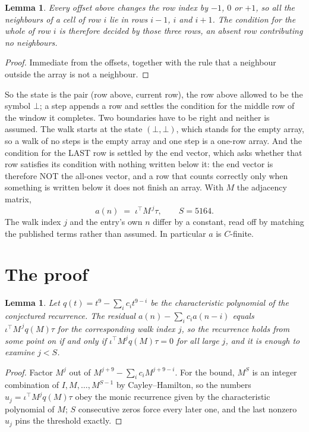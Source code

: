 \documentclass[11pt,a4paper]{article}
\theoremstyle{plain}
\newtheorem{lemma}[theorem]{Lemma}
\theoremstyle{definition}
\begin{document}
\begin{lemma}\label{lem:win}
Every offset above changes the row index by $-1$, $0$ or $+1$, so all the neighbours of a cell
of row $i$ lie in rows $i-1$, $i$ and $i+1$. The condition for the whole of row $i$ is
therefore decided by those three rows, an absent row contributing no neighbours.
\end{lemma}

\begin{proof}
Immediate from the offsets, together with the rule that a neighbour outside the array is not a
neighbour.
\end{proof}

So the state is the pair (row above, current row), the row above allowed to be the symbol
$\bot$; a step appends a row and settles the condition for the middle row of the window it
completes. Two boundaries have to be right and neither is assumed. The walk starts at the state
$(\bot,\bot)$, which stands for the empty array, so a walk of no steps is the empty array and
one step is a one-row array. And the condition for the LAST row is settled by the end vector,
which asks whether that row satisfies its condition with nothing written below it: the end
vector is therefore NOT the all-ones vector, and a row that counts correctly only when
something is written below it does not finish an array. With $M$ the adjacency matrix,
\[
a(n)\;=\;\iota^{\!\top}M^{\,j}\tau ,\qquad S=5164.
\]
The walk index $j$ and the entry's own $n$ differ by a constant, read off by matching the
published terms rather than assumed. In particular $a$ is $C$-finite.

\section{The proof}

\begin{lemma}\label{lem:crit}
Let $q(t)=t^{9}-\sum_i c_it^{9-i}$ be the characteristic polynomial of the
conjectured recurrence. The residual $a(n)-\sum_ic_ia(n-i)$ equals
$\iota^{\!\top}M^{\,j}q(M)\tau$ for the corresponding walk index $j$, so the recurrence
holds from some point on if and only if $\iota^{\!\top}M^{j}q(M)\tau=0$ for all large $j$,
and it is enough to examine $j<S$.
\end{lemma}

\begin{proof}
Factor $M^{j}$ out of $M^{j+9}-\sum_ic_iM^{j+9-i}$. For the bound, $M^{S}$
is an integer combination of $I,M,\dots,M^{S-1}$ by Cayley--Hamilton, so the numbers
$u_j=\iota^{\!\top}M^{j}q(M)\tau$ obey the monic recurrence given by the characteristic
polynomial of $M$; $S$ consecutive zeros force every later one, and the last nonzero $u_j$
pins the threshold exactly.
\end{proof}
\end{document}
